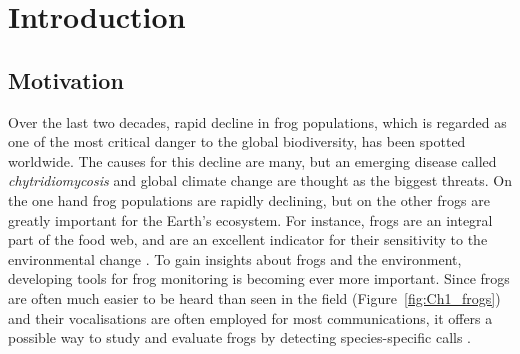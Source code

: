 
\chapter[Introduction]{Introduction}
\label{cha:cha1Introduction}
\section{Motivation}
Over the last two decades, rapid decline in frog populations, which is regarded as one of the most critical danger to the global biodiversity, has been spotted worldwide. The causes for this decline are many, but an emerging disease called \textit{chytridiomycosis}   \citep{mutschmann2015chytridiomycosis} and global climate change \citep{carey2003climate} are thought as the biggest threats. On the one hand frog populations are rapidly declining, but on the other frogs are greatly important for the Earth's ecosystem. For instance, frogs are an integral part of the food web, and are an excellent indicator for their sensitivity to the environmental change \citep{boll2013amphibians}. To gain insights about frogs and the environment, developing tools for frog monitoring is becoming ever more important. Since frogs are often much easier to be heard than seen in the field (Figure~\ref{fig:Ch1_frogs}) and their vocalisations are often employed for most communications, it offers a possible way to study and evaluate frogs by detecting species-specific calls \citep{dorcas2009auditory}.




